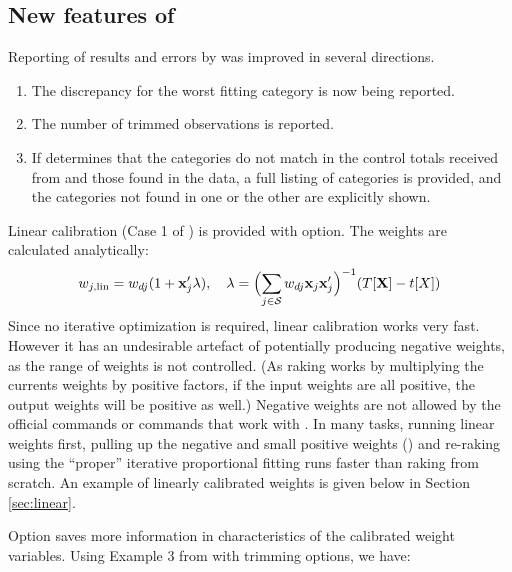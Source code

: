 \subsection{New features of }
\label{subsec:example:meta}

Reporting of results and errors by  was improved in several directions.
\begin{enumerate}
    \item The discrepancy for the worst fitting category is now being reported.
    \item The number of trimmed observations is reported.
    \item If  determines that the categories do not match
        in the control totals received from  and those found in
        the data, a full listing of categories is provided, and the categories
        not found in one or the other are explicitly shown.
\end{enumerate}

Linear calibration (Case 1 of \citet{deville:sarndal:1992}) is provided with
 option. The weights are calculated analytically:
\begin{equation}
    \label{eq:linear:weight}
    w_{j,\rm{lin}} = w_{dj} (1+\mathbf{x}_j'\mathbf{\lambda}),
    \quad
    \mathbf{\lambda} = \Bigl( \sum_{j \in \mathcal{S}} w_{dj} \mathbf{x}_j \mathbf{x}_j' \Bigr)^{-1}
        ( T [ \mathbf{X}  ] - t[X] )
\end{equation}
Since no iterative optimization is required, linear calibration works very fast.
However it has an undesirable artefact of potentially producing negative weights,
as the range of weights is not controlled. (As raking works by multiplying the currents
weights by positive factors, if the input weights are all positive, the output weights
will be positive as well.) Negative weights are not allowed by the official  commands
or commands that work with \stcmd{[pweights]}.
In many tasks, running linear weights first,
pulling up the negative and small positive weights ()
and re-raking using the ``proper'' iterative proportional fitting runs faster than
raking from scratch. An example of linearly calibrated weights is given below
in Section \ref{sec:linear}.

Option  saves more information in characteristics of the calibrated
weight variables. Using Example 3 from \citet{kolenikov:2014} with trimming options,
we have:

